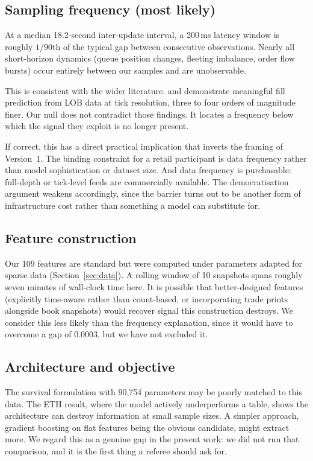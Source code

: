 \documentclass[11pt]{article}
\begin{document}
\subsection{Sampling frequency (most likely)}

At a median 18.2-second inter-update interval, a 200\,ms latency window is
roughly $1/90$th of the typical gap between consecutive observations. Nearly all short-horizon dynamics (queue position changes, fleeting imbalance,
order flow bursts) occur entirely between our samples and are unobservable.

This is consistent with the wider literature. \citet{arroyo2024} and
\citet{maglaras2022} demonstrate meaningful fill prediction from LOB data at
tick resolution, three to four orders of magnitude finer. Our null does not contradict those findings. It locates a frequency below which
the signal they exploit is no longer present.

If correct, this has a direct practical implication that inverts the framing of
Version~1. The binding constraint for a retail participant is data frequency rather than
model sophistication or dataset size. And data frequency is purchasable:
full-depth or tick-level feeds are commercially available. The
democratisation argument weakens accordingly, since the barrier turns out to be
another form of infrastructure cost rather than something a model can substitute
for.

\subsection{Feature construction}

Our 109 features are standard but were computed under parameters adapted for
sparse data (Section~\ref{sec:data}). A rolling window of 10 snapshots spans
roughly seven minutes of wall-clock time here. It is possible that better-designed features (explicitly time-aware rather than
count-based, or incorporating trade prints alongside book snapshots) would
recover signal this construction destroys. We consider this less likely than the frequency
explanation, since it would have to overcome a gap of $0.0003$, but we have not
excluded it.

\subsection{Architecture and objective}

The survival formulation with 90{,}754 parameters may be poorly matched to this
data. The ETH result, where the model actively underperforms a table, shows the
architecture can destroy information at small sample sizes. A simpler
approach, gradient boosting on flat features being the obvious candidate, might
extract more. We regard this as a genuine gap in the present work: we did not
run that comparison, and it is the first thing a referee should ask for.
\end{document}

